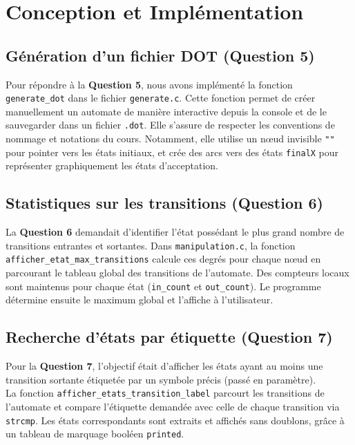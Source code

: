 \documentclass[12pt,a4paper]{article}
\begin{document}
\section{Conception et Implémentation}

\subsection{Génération d'un fichier DOT (Question 5)}
Pour répondre à la \textbf{Question 5}, nous avons implémenté la fonction \texttt{generate\_dot} dans le fichier \texttt{generate.c}. Cette fonction permet de créer manuellement un automate de manière interactive depuis la console et de le sauvegarder dans un fichier \texttt{.dot}. Elle s'assure de respecter les conventions de nommage et notations du cours. Notamment, elle utilise un nœud invisible \texttt{""} pour pointer vers les états initiaux, et crée des arcs vers des états \texttt{finalX} pour représenter graphiquement les états d'acceptation.


\subsection{Statistiques sur les transitions (Question 6)}
La \textbf{Question 6} demandait d'identifier l'état possédant le plus grand nombre de transitions entrantes et sortantes. Dans \texttt{manipulation.c}, la fonction \texttt{afficher\_etat\_max\_transitions} calcule ces degrés pour chaque nœud en parcourant le tableau global des transitions de l'automate. Des compteurs locaux sont maintenus pour chaque état (\texttt{in\_count} et \texttt{out\_count}). Le programme détermine ensuite le maximum global et l'affiche à l'utilisateur.

\subsection{Recherche d'états par étiquette (Question 7)}
Pour la \textbf{Question 7}, l'objectif était d'afficher les états ayant au moins une transition sortante étiquetée par un symbole précis (passé en paramètre).\\
La fonction \texttt{afficher\_etats\_transition\_label} parcourt les transitions de l'automate et compare l'étiquette demandée avec celle de chaque transition via \texttt{strcmp}. Les états correspondants sont extraits et affichés sans doublons, grâce à un tableau de marquage booléen \texttt{printed}.
\end{document}
